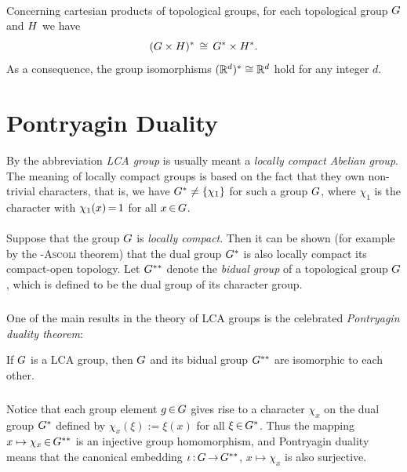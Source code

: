 \documentclass[11pt,twoside]{article}
\begin{document}
\paragraph{}
Concerning cartesian products of topological groups,
for each topological group $G$ and $H$
we have
\[
(G \times H)^* \, \cong \, {G}^* \times {H}^*.
\]
As a consequence,
the group isomorphisms $({\mathbb{R}}^d)^* \cong {\mathbb{R}}^d$ hold for any integer $d$.

\section{Pontryagin Duality}                                                   %
By the abbreviation \textit{LCA group} is usually meant
a \textit{locally compact Abelian group}.
The meaning of locally compact groups is based on the fact
that they own non-trivial characters,
that is,
we have $G^* \neq \{\chi_1\}$ for such a group $G$,
where $\chi_1$ is the character with $\chi_1(x) {\,=\,} 1$ for all $x {\,\in\,} G$.

\paragraph{} %
Suppose that the group ${G}$ is \textit{locally compact}.
Then it can be shown (for example by the \textsc{{\ARZELA}-Ascoli} theorem)
that the dual group $G^*$ is also locally compact
{\wrt} its compact-open topology.
Let $G^{**}$ denote the \textit{bidual group}
of a topological group $G$,
which is defined to be the dual group of its character group.

\subparagraph{}
One of the main results in the theory of LCA groups is the celebrated
\textit{Pontryagin duality theorem}:

\begin{theorem}\label{PONTRYAGIN_DUALITY_THEOREM}
If $G$ is a LCA group,
then $G$ and its bidual group $G^{**}$ are isomorphic to each other.
\end{theorem}

\subparagraph{}
Notice that
each group element $g {\,\in\,} G$ gives rise to a character $\chi_x$
on the dual group $G^*$ defined by $\chi_x(\xi) := \xi(x)$
for all $\xi {\,\in\,} G^*$.
Thus the mapping $x \mapsto \chi_x {\,\in\,} G^{**}$ is an injective group
homomorphism,
and Pontryagin duality means
that the canonical embedding $\iota {\,:\,} G {\,\to\,} {G}^{**}$,
$x \mapsto \chi_x$ is also surjective.
\end{document}
